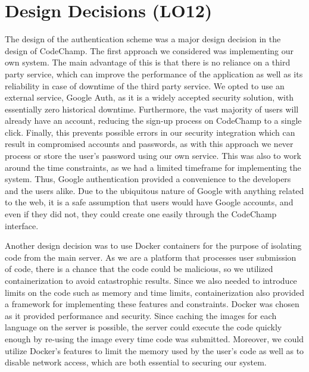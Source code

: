 \documentclass[12pt, titlepage]{article}
\begin{document}
\section{Design Decisions (LO12)}
 
The design of the authentication scheme was a major design decision in the design of CodeChamp. The first approach we considered was implementing our own system. The main advantage of this is that there is no reliance on a third party service, which can improve the performance of the application as well as its reliability in case of downtime of the third party service. We opted to use an external service, Google Auth, as it is a widely accepted security solution, with essentially zero historical downtime. Furthermore, the vast majority of users will already have an account, reducing the sign-up process on CodeChamp to a single click. Finally, this prevents possible errors in our security integration which can result in compromised accounts and passwords, as with this approach we never process or store the user's password using our own service. This was also to work around the time constraints, as we had a limited timeframe for implementing the system. Thus, Google authentication provided a convenience to the developers and the users alike.  Due to the ubiquitous nature of Google with anything related to the web, it is a safe assumption that users would have Google accounts, and even if they did not, they could create one easily through the CodeChamp interface.

Another design decision was to use Docker containers for the purpose of isolating code from the main server. As we are a platform that processes user submission of code, there is a chance that the code could be malicious, so we utilized containerization to avoid catastrophic results. Since we also needed to introduce limits on the code such as memory and time limits, containerization also provided a framework for implementing these features and constraints. Docker was chosen as it provided performance and security. Since caching the images for each language on the server is possible, the server could execute the code quickly enough by re-using the image every time code was submitted. Moreover, we could utilize Docker's features to limit the memory used by the user's code as well as to disable network access, which are both essential to securing our system.
\end{document}
